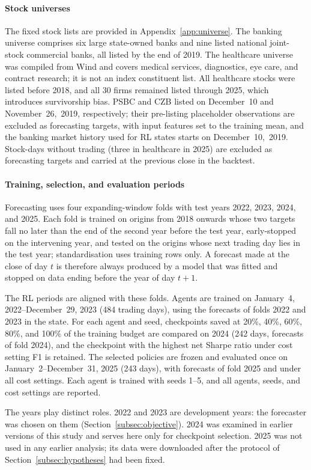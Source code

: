 \documentclass[pdflatex,sn-mathphys-num]{sn-jnl}%
\theoremstyle{thmstyleone}%
\theoremstyle{thmstyletwo}%
\theoremstyle{thmstylethree}%
\begin{document}
\paragraph{Stock universes}
{\color{blue}
The fixed stock lists are provided in Appendix~\ref{app:universe}. The banking universe comprises six large state-owned banks and nine listed national joint-stock commercial banks, all listed by the end of 2019. The healthcare universe was compiled from Wind and covers medical services, diagnostics, eye care, and contract research; it is not an index constituent list. All healthcare stocks were listed before 2018, and all 30 firms remained listed through 2025, which introduces survivorship bias. PSBC and CZB listed on December~10 and November~26,~2019, respectively; their pre-listing placeholder observations are excluded as forecasting targets, with input features set to the training mean, and the banking market history used for RL states starts on December~10,~2019. Stock-days without trading (three in healthcare in 2025) are excluded as forecasting targets and carried at the previous close in the backtest.
\par}

\paragraph{Training, selection, and evaluation periods}
\label{subsec:splits}
{\color{blue}
Forecasting uses four expanding-window folds with test years 2022, 2023, 2024, and 2025. Each fold is trained on origins from 2018 onwards whose two targets fall no later than the end of the second year before the test year, early-stopped on the intervening year, and tested on the origins whose next trading day lies in the test year; standardisation uses training rows only. A forecast made at the close of day $t$ is therefore always produced by a model that was fitted and stopped on data ending before the year of day $t+1$.

The RL periods are aligned with these folds. Agents are trained on January~4, 2022--December~29, 2023 (484 trading days), using the forecasts of folds 2022 and 2023 in the state. For each agent and seed, checkpoints saved at 20\%, 40\%, 60\%, 80\%, and 100\% of the training budget are compared on 2024 (242 days, forecasts of fold 2024), and the checkpoint with the highest net Sharpe ratio under cost setting F1 is retained. The selected policies are frozen and evaluated once on January~2--December~31, 2025 (243 days), with forecasts of fold 2025 and under all cost settings. Each agent is trained with seeds 1--5, and all agents, seeds, and cost settings are reported.

The years play distinct roles. 2022 and 2023 are development years: the forecaster was chosen on them (Section~\ref{subsec:objective}). 2024 was examined in earlier versions of this study and serves here only for checkpoint selection. 2025 was not used in any earlier analysis; its data were downloaded after the protocol of Section~\ref{subsec:hypotheses} had been fixed.
\par}
\end{document}

